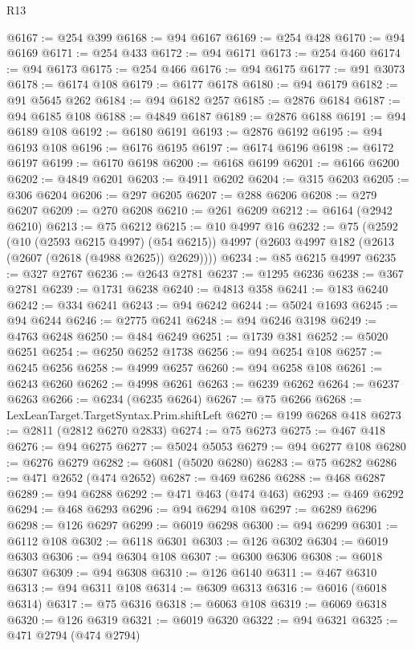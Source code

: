 \begin{lexlean}{R13}
\begin{coremodule}
@6167 := @254 @399
@6168 := @94 @6167
@6169 := @254 @428
@6170 := @94 @6169
@6171 := @254 @433
@6172 := @94 @6171
@6173 := @254 @460
@6174 := @94 @6173
@6175 := @254 @466
@6176 := @94 @6175
@6177 := @91 @3073
@6178 := @6174 @108
@6179 := @6177 @6178
@6180 := @94 @6179
@6182 := @91 @5645 @262
@6184 := @94 @6182 @257
@6185 := @2876 @6184
@6187 := @94 @6185 @108
@6188 := @4849 @6187
@6189 := @2876 @6188
@6191 := @94 @6189 @108
@6192 := @6180 @6191
@6193 := @2876 @6192
@6195 := @94 @6193 @108
@6196 := @6176 @6195
@6197 := @6174 @6196
@6198 := @6172 @6197
@6199 := @6170 @6198
@6200 := @6168 @6199
@6201 := @6166 @6200
@6202 := @4849 @6201
@6203 := @4911 @6202
@6204 := @315 @6203
@6205 := @306 @6204
@6206 := @297 @6205
@6207 := @288 @6206
@6208 := @279 @6207
@6209 := @270 @6208
@6210 := @261 @6209
@6212 := @6164 (@2942 @6210)
@6213 := @75 @6212
@6215 := @10 @4997 @16
@6232 := @75
    (@2592
      (@10 (@2593 @6215 @4997) (@54 @6215))
      @4997
      (@2603 @4997 @182 (@2613 (@2607 (@2618 (@4988 @2625)) @2629))))
@6234 := @85 @6215 @4997
@6235 := @327 @2767
@6236 := @2643 @2781
@6237 := @1295 @6236
@6238 := @367 @2781
@6239 := @1731 @6238
@6240 := @4813 @358
@6241 := @183 @6240
@6242 := @334 @6241
@6243 := @94 @6242
@6244 := @5024 @1693
@6245 := @94 @6244
@6246 := @2775 @6241
@6248 := @94 @6246 @3198
@6249 := @4763 @6248
@6250 := @484 @6249
@6251 := @1739 @381
@6252 := @5020 @6251
@6254 := @6250 @6252 @1738
@6256 := @94 @6254 @108
@6257 := @6245 @6256
@6258 := @4999 @6257
@6260 := @94 @6258 @108
@6261 := @6243 @6260
@6262 := @4998 @6261
@6263 := @6239 @6262
@6264 := @6237 @6263
@6266 := @6234 (@6235 @6264)
@6267 := @75 @6266
@6268 := LexLeanTarget.TargetSyntax.Prim.shiftLeft
@6270 := @199 @6268 @418
@6273 := @2811 (@2812 @6270 @2833)
@6274 := @75 @6273
@6275 := @467 @418
@6276 := @94 @6275
@6277 := @5024 @5053
@6279 := @94 @6277 @108
@6280 := @6276 @6279
@6282 := @6081 (@5020 @6280)
@6283 := @75 @6282
@6286 := @471 @2652 (@474 @2652)
@6287 := @469 @6286
@6288 := @468 @6287
@6289 := @94 @6288
@6292 := @471 @463 (@474 @463)
@6293 := @469 @6292
@6294 := @468 @6293
@6296 := @94 @6294 @108
@6297 := @6289 @6296
@6298 := @126 @6297
@6299 := @6019 @6298
@6300 := @94 @6299
@6301 := @6112 @108
@6302 := @6118 @6301
@6303 := @126 @6302
@6304 := @6019 @6303
@6306 := @94 @6304 @108
@6307 := @6300 @6306
@6308 := @6018 @6307
@6309 := @94 @6308
@6310 := @126 @6140
@6311 := @467 @6310
@6313 := @94 @6311 @108
@6314 := @6309 @6313
@6316 := @6016 (@6018 @6314)
@6317 := @75 @6316
@6318 := @6063 @108
@6319 := @6069 @6318
@6320 := @126 @6319
@6321 := @6019 @6320
@6322 := @94 @6321
@6325 := @471 @2794 (@474 @2794)

\end{coremodule}
\end{lexlean}
